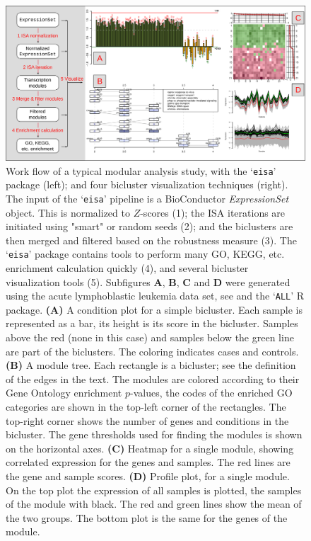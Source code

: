 \documentclass{bioinfo}
\newcommand{\Rpackage}[1]{`\texttt{#1}'}
\newcommand{\Rclass}[1]{\textsl{#1}}
\newcommand{\subfig}[1]{\textbf{#1}}
\begin{document}
\begin{figure}
\centering
\includegraphics[width=\textwidth]{isa2workflow3}
\caption{Work flow of a typical modular analysis study, with the
  \Rpackage{eisa} package (left); and four bicluster visualization
  techniques (right). The input of the \Rpackage{eisa} pipeline is a
  BioConductor \Rclass{ExpressionSet} object. This is normalized to
  $Z$-scores (1); the ISA iterations are initiated using "smart" or
  random seeds (2); and the biclusters are then merged and filtered
  based on the robustness measure (3). The \Rpackage{eisa} package
  contains tools to perform many GO, KEGG, etc. enrichment calculation
  quickly (4), and several bicluster visualization tools (5).
  Subfigures \subfig{A}, \subfig{B}, \subfig{C} and \subfig{D} were
generated
  using the acute lymphoblastic leukemia data set, see
  \cite{chiaretti04} and the \Rpackage{ALL} R package.
  \subfig{(A)} A condition plot for a simple bicluster. Each sample is
  represented as a bar, its height is its score in the bicluster.
  Samples above the red (none in this case) and samples
  below the green line are part of the biclusters. The coloring
  indicates cases and controls.
  \subfig{(B)} A module tree. Each rectangle is a bicluster; see the
  definition of the edges in the text. The modules are colored
  according to their Gene Ontology enrichment $p$-values, the codes of
  the enriched GO categories are shown in the top-left corner of the
  rectangles. The top-right corner shows the number of genes and
  conditions in the bicluster. The gene thresholds used for finding
  the modules is shown on the horizontal axes.
  \subfig{(C)} Heatmap for a single module, showing correlated
  expression for the genes and samples. The red lines are the gene and
  sample scores.
  \subfig{(D)} Profile plot, for a single module. On the top plot the
  expression of all samples is plotted, the samples of the module
  with black. The red and green lines show the mean of the two
  groups. The bottom plot is the same for the genes of the module.
}
\label{fig:workflow}
\end{figure}
\end{document}

